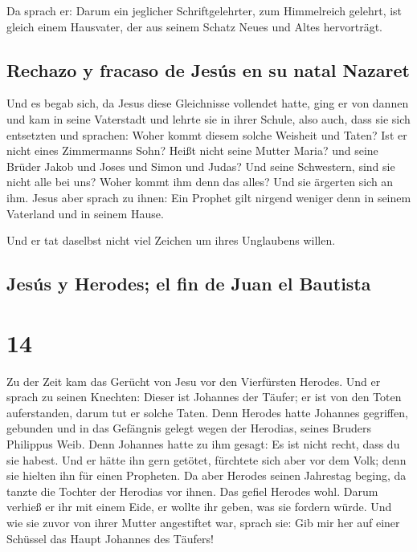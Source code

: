  Da sprach er: Darum ein jeglicher Schriftgelehrter, zum
Himmelreich gelehrt, ist gleich einem Hausvater, der aus seinem Schatz
Neues und Altes hervorträgt.

\hypertarget{rechazo-y-fracaso-de-jesuxfas-en-su-natal-nazaret}{%
\subsection{Rechazo y fracaso de Jesús en su natal
Nazaret}\label{rechazo-y-fracaso-de-jesuxfas-en-su-natal-nazaret}}

 Und es begab sich, da Jesus diese Gleichnisse vollendet
hatte, ging er von dannen  und kam in seine Vaterstadt
und lehrte sie in ihrer Schule, also auch, dass sie sich entsetzten und
sprachen: Woher kommt diesem solche Weisheit und Taten? 
Ist er nicht eines Zimmermanns Sohn? Heißt nicht seine Mutter Maria? und
seine Brüder Jakob und Joses und Simon und Judas?  Und
seine Schwestern, sind sie nicht alle bei uns? Woher kommt ihm denn das
alles?  Und sie ärgerten sich an ihm. Jesus aber sprach
zu ihnen: Ein Prophet gilt nirgend weniger denn in seinem Vaterland und
in seinem Hause.

 Und er tat daselbst nicht viel Zeichen um ihres
Unglaubens willen.

\hypertarget{jesuxfas-y-herodes-el-fin-de-juan-el-bautista}{%
\subsection{Jesús y Herodes; el fin de Juan el
Bautista}\label{jesuxfas-y-herodes-el-fin-de-juan-el-bautista}}

\hypertarget{section-13}{%
\section{14}\label{section-13}}

 Zu der Zeit kam das Gerücht von Jesu vor den Vierfürsten
Herodes.  Und er sprach zu seinen Knechten: Dieser ist
Johannes der Täufer; er ist von den Toten auferstanden, darum tut er
solche Taten.  Denn Herodes hatte Johannes gegriffen,
gebunden und in das Gefängnis gelegt wegen der Herodias, seines Bruders
Philippus Weib.  Denn Johannes hatte zu ihm gesagt: Es ist
nicht recht, dass du sie habest.  Und er hätte ihn gern
getötet, fürchtete sich aber vor dem Volk; denn sie hielten ihn für
einen Propheten.  Da aber Herodes seinen Jahrestag beging,
da tanzte die Tochter der Herodias vor ihnen. Das gefiel Herodes wohl.
 Darum verhieß er ihr mit einem Eide, er wollte ihr geben,
was sie fordern würde.  Und wie sie zuvor von ihrer Mutter
angestiftet war, sprach sie: Gib mir her auf einer Schüssel das Haupt
Johannes des Täufers!

